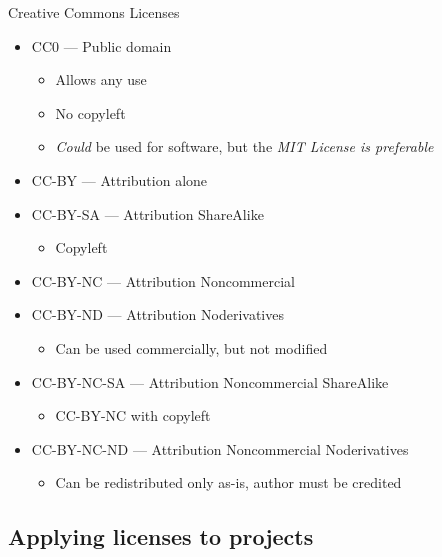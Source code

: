 \documentclass[presentation]{beamer}
\begin{document}
\begin{frame}{Creative Commons Licenses}
    \begin{itemize}
        \item CC0 --- Public domain
        \begin{itemize}
            \item Allows any use
            \item No copyleft
            \item \textit{Could} be used for software, but the \textit{MIT License is preferable}
        \end{itemize}
        \item CC-BY --- Attribution alone
        \item CC-BY-SA --- Attribution ShareAlike
        \begin{itemize}
            \item Copyleft
        \end{itemize}
        \item CC-BY-NC --- Attribution Noncommercial
        \item CC-BY-ND --- Attribution Noderivatives
        \begin{itemize}
            \item Can be used commercially, but not modified
        \end{itemize}
        \item CC-BY-NC-SA --- Attribution Noncommercial ShareAlike
        \begin{itemize}
            \item CC-BY-NC with copyleft
        \end{itemize}
        \item CC-BY-NC-ND --- Attribution Noncommercial Noderivatives
        \begin{itemize}
            \item Can be redistributed only as-is, author must be credited
        \end{itemize}
    \end{itemize}
\end{frame}

\subsection{Applying licenses to projects}
\end{document}
